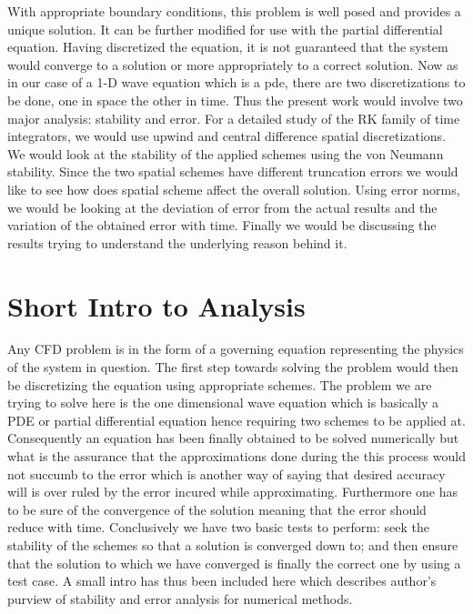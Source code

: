 \documentclass[a4paper,12pt]{report}
\begin{document}
With appropriate boundary conditions, this problem is well posed and provides a unique solution. It can be further modified for use with the partial differential equation. Having discretized the equation, it is not guaranteed that the system would converge to a solution or more appropriately to a correct solution. Now as in our case of a 1-D wave equation which is a pde, there are two discretizations to be done, one in space the other in time. Thus the present work would involve two major analysis: stability and error. For a detailed study of the RK family of time integrators, we would use upwind and central difference spatial discretizations. We would look at the stability of the applied schemes using the von Neumann stability. Since the two spatial schemes have different truncation errors we would like to see how does spatial scheme affect the overall solution. Using error norms, we would be looking at the deviation of error from the actual results and the variation of the obtained error with time. Finally we would be discussing the results trying to understand the underlying reason behind it. 
\chapter{Short Intro to Analysis}
Any CFD problem is in the form of a governing equation representing the physics of the system in question. The first step towards solving the problem would then be discretizing the equation using appropriate schemes. The problem we are trying to solve here is the one dimensional wave equation which is basically a PDE or partial differential equation hence requiring two schemes to be applied at. Consequently an equation has been finally obtained to be solved numerically but what is the assurance that the approximations done during the this process would not succumb to the error which is another way of saying that desired accuracy will is over ruled by the error incured while approximating. Furthermore one has to be sure of the convergence of the solution meaning that the error should reduce with time. Conclusively we have two basic tests to perform: seek the stability of the schemes so that a solution is converged down to; and then ensure that the solution to which we have converged is finally the correct one by using a test case. A small intro has thus been included here which describes author's purview of stability and error analysis for numerical methods.
\end{document}
